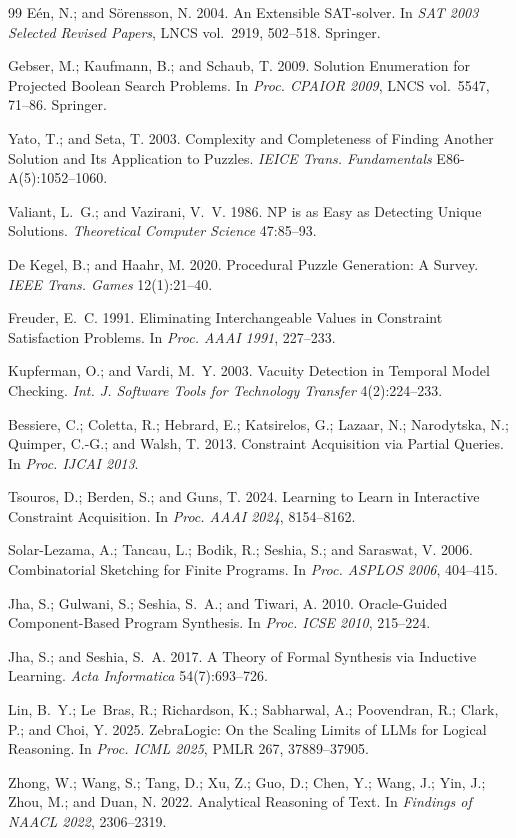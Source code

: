 \documentclass[letterpaper]{article}
\begin{document}
\begin{thebibliography}{99}
E\'{e}n, N.; and S\"{o}rensson, N. 2004.
An Extensible SAT-solver.
In \textit{SAT 2003 Selected Revised Papers}, LNCS vol.~2919, 502--518. Springer.

Gebser, M.; Kaufmann, B.; and Schaub, T. 2009.
Solution Enumeration for Projected Boolean Search Problems.
In \textit{Proc. CPAIOR 2009}, LNCS vol.~5547, 71--86. Springer.

Yato, T.; and Seta, T. 2003.
Complexity and Completeness of Finding Another Solution and Its
Application to Puzzles.
\textit{IEICE Trans. Fundamentals} E86-A(5):1052--1060.

Valiant, L.~G.; and Vazirani, V.~V. 1986.
NP is as Easy as Detecting Unique Solutions.
\textit{Theoretical Computer Science} 47:85--93.

De Kegel, B.; and Haahr, M. 2020.
Procedural Puzzle Generation: A Survey.
\textit{IEEE Trans. Games} 12(1):21--40.

Freuder, E.~C. 1991.
Eliminating Interchangeable Values in Constraint Satisfaction Problems.
In \textit{Proc. AAAI 1991}, 227--233.

Kupferman, O.; and Vardi, M.~Y. 2003.
Vacuity Detection in Temporal Model Checking.
\textit{Int. J. Software Tools for Technology Transfer} 4(2):224--233.

Bessiere, C.; Coletta, R.; Hebrard, E.; Katsirelos, G.; Lazaar, N.;
Narodytska, N.; Quimper, C.-G.; and Walsh, T. 2013.
Constraint Acquisition via Partial Queries.
In \textit{Proc. IJCAI 2013}.

Tsouros, D.; Berden, S.; and Guns, T. 2024.
Learning to Learn in Interactive Constraint Acquisition.
In \textit{Proc. AAAI 2024}, 8154--8162.

Solar-Lezama, A.; Tancau, L.; Bodik, R.; Seshia, S.; and Saraswat, V. 2006.
Combinatorial Sketching for Finite Programs.
In \textit{Proc. ASPLOS 2006}, 404--415.

Jha, S.; Gulwani, S.; Seshia, S.~A.; and Tiwari, A. 2010.
Oracle-Guided Component-Based Program Synthesis.
In \textit{Proc. ICSE 2010}, 215--224.

Jha, S.; and Seshia, S.~A. 2017.
A Theory of Formal Synthesis via Inductive Learning.
\textit{Acta Informatica} 54(7):693--726.

Lin, B.~Y.; Le~Bras, R.; Richardson, K.; Sabharwal, A.; Poovendran, R.;
Clark, P.; and Choi, Y. 2025.
ZebraLogic: On the Scaling Limits of LLMs for Logical Reasoning.
In \textit{Proc. ICML 2025}, PMLR 267, 37889--37905.

Zhong, W.; Wang, S.; Tang, D.; Xu, Z.; Guo, D.; Chen, Y.; Wang, J.;
Yin, J.; Zhou, M.; and Duan, N. 2022.
Analytical Reasoning of Text.
In \textit{Findings of NAACL 2022}, 2306--2319.

\end{thebibliography}
\end{document}
